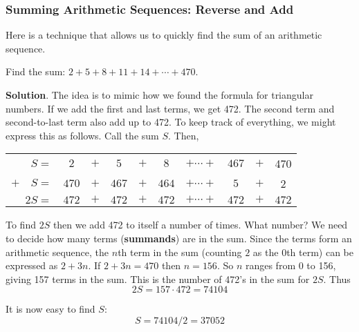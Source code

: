\documentclass[11pt,]{book}
\newcommand{\terminology}[1]{\textbf{#1}}
\theoremstyle{ptxplainnotitle}
\theoremstyle{ptxplaintitle}
\theoremstyle{ptxdefinitionnotitle}
\theoremstyle{ptxdefinitiontitle}
\theoremstyle{ptxdefinitionnotitle}
\theoremstyle{ptxdefinitiontitle}
\theoremstyle{ptxdefinitionnotitle}
\theoremstyle{ptxdefinitiontitle}
\theoremstyle{ptxdefinitiontitlenonumber}
\theoremstyle{ptxdefinitiontitlenonumber}
\numberwithin{equation}{chapter}
\newcommand{\hrulethin}  {\noalign{\hrule height 0.04em}}
\begin{document}
\subsubsection[{Summing Arithmetic Sequences: Reverse and Add}]{Summing Arithmetic Sequences: Reverse and Add}\label{subsubsection-1}
\hypertarget{p-192}{}%
Here is a technique that allows us to quickly find the sum of an arithmetic sequence.%
\begin{example}\label{example-7}
\hypertarget{p-193}{}%
Find the sum: \(2 + 5 + 8 + 11 + 14 + \cdots + 470\).%
\par\smallskip%
\noindent\textbf{Solution}.\hypertarget{solution-15}{}\quad%
\hypertarget{p-194}{}%
The idea is to mimic how we found the formula for triangular numbers. If we add the first and last terms, we get 472. The second term and second-to-last term also add up to 472. To keep track of everything, we might express this as follows. Call the sum \(S\). Then,%
\begin{sidebyside}{1}{0}{0}{0}
\begin{sbspanel}{1}
{\centering%
\begin{tabular}{rccccccccc}
\(S  =\)&\(2\)&\(+\)&\(5\)&\(+\)&\(8\)&\(+ \cdots +\)&\(467\)&\(+\)&470\tabularnewline[0pt]
\(+ \quad S  =\)&\(470\)&\(+\)&\(467\)&\(+\)&\(464\)&\(+ \cdots +\)&\(5\)&\(+\)&2\tabularnewline\hrulethin
\(2S  =\)&\(472\)&\(+\)&\(472\)&\(+\)&\(472\)&\(+ \cdots +\)&\(472\)&\(+\)&\(472\)
\end{tabular}
\par}
\end{sbspanel}
\end{sidebyside}
\par
\hypertarget{p-195}{}%
To find \(2S\) then we add 472 to itself a number of times. What number? We need to decide how many terms (\terminology{summands}) are in the sum. Since the terms form an arithmetic sequence, the \(n\)th term in the sum (counting \(2\) as the 0th term) can be expressed as \(2 + 3n\). If \(2 + 3n = 470\) then \(n = 156\). So \(n\) ranges from 0 to 156, giving 157 terms in the sum. This is the number of 472's in the sum for \(2S\). Thus%
\begin{equation*}
2S = 157\cdot 472 = 74104
\end{equation*}
%
\par
\hypertarget{p-196}{}%
It is now easy to find \(S\):%
\begin{equation*}
S = 74104/2 = 37052
\end{equation*}
%
\end{example}
\end{document}

